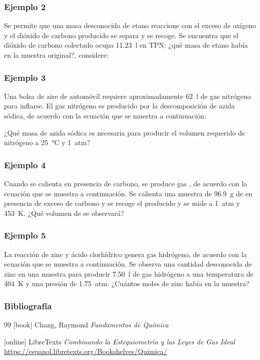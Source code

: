 \documentclass[11pt, aspectratio=169, xcolor=table]{beamer}
\begin{document}
\begin{frame}
  \frametitle{Ejemplo 2}
  Se permite que una masa desconocida de etano reaccione con el exceso de oxígeno y el dióxido de carbono producido se separa y se recoge. Se encuentra que el dióxido de carbono colectado ocupa \qty{11.23}{\litre} en TPN; ¿qué masa de etano había en la muestra original?, considere:
  \begin{center}
  \end{center}
\end{frame}

\begin{frame}
  \frametitle{Ejemplo 3}
  Una bolsa de aire de automóvil requiere aproximadamente \qty{62}{\litre} de gas nitrógeno para inflarse. El gas nitrógeno es producido por la descomposición de azida sódica, de acuerdo con la ecuación que se muestra a continuación:
  \begin{center}
  \end{center}
  ¿Qué masa de azida sódica es necesaria para producir el volumen requerido de nitrógeno a \qty{25}{\degreeCelsius} y \qty{1}{atm}?
\end{frame}

\begin{frame}
  \frametitle{Ejemplo 4}
  Cuando se calienta  en presencia de carbono, se produce gas , de acuerdo con la ecuación que se muestra a continuación. Se calienta una muestra de \qty{96.9}{\gram} de  en presencia de exceso de carbono y se recoge el  producido y se mide a \qty{1}{atm} y \qty{453}{\kelvin}. ¿Qué volumen de  se observará?
  \begin{center}
  \end{center}
\end{frame}

\begin{frame}
  \frametitle{Ejemplo 5}
    La reacción de zinc y ácido clorhídrico genera gas hidrógeno, de acuerdo con la ecuación que se muestra a continuación. Se observa una cantidad desconocida de zinc en una muestra para producir \qty{7.50}{\litre} de gas hidrógeno a una temperatura de \qty{404}{\kelvin} y una presión de \qty{1.75}{atm}. ¿Cuántos moles de zinc había en la muestra?
    \begin{center}
    \end{center}
\end{frame}

\begin{frame}
  \frametitle{Bibliografía}
  \begin{thebibliography}{99}
    [book]
    Chang, Raymond
    \newblock \emph{Fundamentos de Química}

    [online]
    LibreTexts
    \newblock \emph{Combinando la Estequiometría y las Leyes de Gas Ideal}
    \newblock \url{https://espanol.libretexts.org/Bookshelves/Quimica/}
  \end{thebibliography}
\end{frame}
\end{document}
